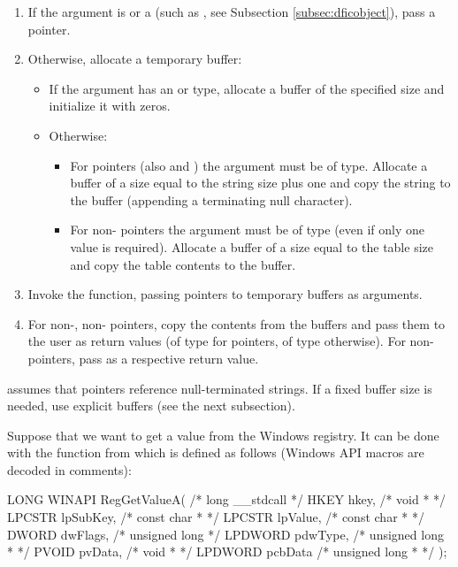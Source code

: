 \documentclass[a4paper,12pt,twoside,extrafontsizes]{memoir}
\begin{document}
\begin{enumerate}
	\item If the argument is  or a   (such as , see Subsection \ref{subsec:dficobject}), pass a  pointer.
	\item Otherwise, allocate a temporary buffer:
		\begin{itemize}
			\item If the argument has an  or  type, allocate a buffer of the specified size and initialize it with zeros.
			\item Otherwise:
				\begin{itemize}
					\item For  pointers (also  and ) the argument must be of  type. Allocate a buffer of a size equal to the string size plus one and copy the string to the buffer (appending a terminating null character).
					\item For non- pointers the argument must be of  type (even if only one value is required). Allocate a buffer of a size equal to the table size and copy the table contents to the buffer.
				\end{itemize}
		\end{itemize}
	\item Invoke the function, passing pointers to temporary buffers as arguments.
	\item For non-, non- pointers, copy the contents from the buffers and pass them to the user as return values (of  type for  pointers, of  type otherwise). For non-  pointers, pass  as a respective return value.
\end{enumerate}

 assumes that  pointers reference null-terminated strings. If a fixed buffer size is needed, use explicit buffers (see the next subsection).

Suppose that we want to get a value from the Windows registry. It can be done with the  function from  which is defined as follows (Windows API macros are decoded in comments):

\begin{breakshellcmds}\begin{ccode}
LONG WINAPI RegGetValueA(   /*   long __stdcall    */
    HKEY hkey,              /*   void *            */
    LPCSTR lpSubKey,        /*   const char *      */
    LPCSTR lpValue,         /*   const char *      */
    DWORD dwFlags,          /*   unsigned long     */
    LPDWORD pdwType,        /*   unsigned long *   */
    PVOID pvData,           /*   void *            */
    LPDWORD pcbData         /*   unsigned long *   */
);
\end{ccode}\end{breakshellcmds}
\end{document}
